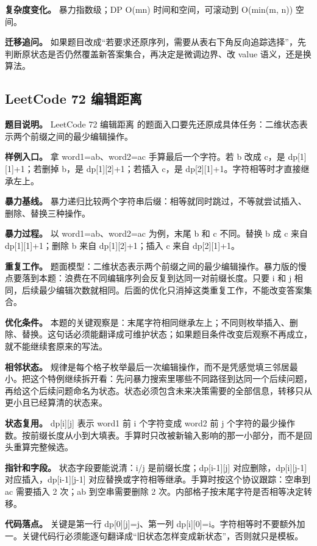 \textbf{复杂度变化。} 暴力指数级；DP O(mn) 时间和空间，可滚动到 O(min(m, n)) 空间。

\textbf{迁移追问。} 如果题目改成“若要求还原序列，需要从表右下角反向追踪选择”，先判断原状态是否仍然覆盖新答案集合，再决定是微调边界、改 value 语义，还是换算法。

\subsection{LeetCode 72 编辑距离}

\textbf{题目说明。} LeetCode 72 编辑距离 的题面入口要先还原成具体任务：二维状态表示两个前缀之间的最少编辑操作。

\textbf{样例入口。} 拿 word1=ab、word2=ac 手算最后一个字符。若 b 改成 c，是 dp[1][1]+1；若删掉 b，是 dp[1][2]+1；若插入 c，是 dp[2][1]+1。字符相等时才直接继承左上。

\textbf{暴力基线。} 暴力递归比较两个字符串后缀：相等就同时跳过，不等就尝试插入、删除、替换三种操作。

\textbf{暴力过程。} 以 word1=ab、word2=ac 为例，末尾 b 和 c 不同。替换 b 成 c 来自 dp[1][1]+1；删除 b 来自 dp[1][2]+1；插入 c 来自 dp[2][1]+1。

\textbf{重复工作。} 题面模型：二维状态表示两个前缀之间的最少编辑操作。暴力版的慢点要落到本题：浪费在不同编辑序列会反复到达同一对前缀长度。只要 i 和 j 相同，后续最少编辑次数就相同。后面的优化只消掉这类重复工作，不能改变答案集合。

\textbf{优化条件。} 本题的关键观察是：末尾字符相同继承左上；不同则枚举插入、删除、替换。这句话必须能翻译成可维护状态；如果题目条件改变后观察不再成立，就不能继续套原来的写法。

\textbf{相邻状态。} 规律是每个格子枚举最后一次编辑操作，而不是凭感觉填三邻居最小。把这个特例继续拆开看：先问暴力搜索里哪些不同路径到达同一个后续问题，再给这个后续问题命名为状态。状态必须包含未来决策需要的全部信息，转移只从更小且已经算清的状态来。

\textbf{状态复用。} dp[i][j] 表示 word1 前 i 个字符变成 word2 前 j 个字符的最少操作数。按前缀长度从小到大填表。手算时只改被新输入影响的那一小部分，而不是回头重算完整候选。

\textbf{指针和字段。} 状态字段要能说清：i/j 是前缀长度；dp[i-1][j] 对应删除，dp[i][j-1] 对应插入，dp[i-1][j-1] 对应替换或字符相等继承。手算时按这个协议跟踪：空串到 ac 需要插入 2 次；ab 到空串需要删除 2 次。内部格子按末尾字符是否相等决定转移。

\textbf{代码落点。} 关键是第一行 dp[0][j]=j、第一列 dp[i][0]=i。字符相等时不要额外加一。关键代码行必须能逐句翻译成“旧状态怎样变成新状态”，否则就只是模板。

